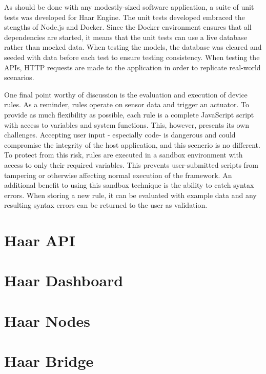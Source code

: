     As should be done with any modestly-sized software application, a suite of unit tests was developed for Haar Engine. The unit tests developed embraced the stengths of Node.js and Docker. Since the Docker environment ensures that all dependencies are started, it means that the unit tests can use a live database rather than mocked data. When testing the models, the database was cleared and seeded with data before each test to ensure testing consistency. When testing the APIs, HTTP requests are made to the application in order to replicate real-world scenarios.

    One final point worthy of discussion is the evaluation and execution of device rules. As a reminder, rules operate on sensor data and trigger an actuator. To provide as much flexibility as possible, each rule is a complete JavaScript script with access to variables and system functions. This, however, presents its own challenges. Accepting user input - especially code- is dangerous and could compromise the integrity of the host application, and this scenerio is no different. To protect from this risk, rules are executed in a sandbox environment with access to only their required variables. This prevents user-submitted scripts from tampering or otherwise affecting normal execution of the framework. An additional benefit to using this sandbox technique is the ability to catch syntax errors. When storing a new rule, it can be evaluated with example data and any resulting syntax errors can be returned to the user as validation.

  \section{Haar API}
  \section{Haar Dashboard}
  \section{Haar Nodes}
  \section{Haar Bridge}
